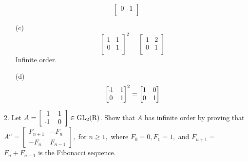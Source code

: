 \begin{mdframed}[style=darkAnswer,frametitle={Joe Starr}]
\begin{multicols}{2}
\begin{itemize}
{$$\begin{bmatrix}
              0 & 1\\
        \end{bmatrix}$$}
  \end{itemize}
\end{multicols}
\begin{multicols}{2}
  \begin{itemize}
    \item[(c)]{ 
                $$\begin{bmatrix}1 & 1 \\ 
                  0 & 1 \\
                \end{bmatrix}^2=\begin{bmatrix}1 & 2 \\ 
                  0 & 1 \\
                \end{bmatrix}$$
                Infinite order.
                }
    \item[(d)]{ 
                $$\begin{bmatrix}\m 1 & 1 \\ 
                  0 & 1 \\
                \end{bmatrix}^2=\begin{bmatrix}1 & 0 \\ 
                  0 & 1 \\
                \end{bmatrix}$$}
  \end{itemize}
\end{multicols}
\end{mdframed}
\newpage
\begin{mdframed}[style=darkQuesion]
  2. Let $A=\left[\begin{array}{rr}1 & \m 1 \\
  \m 1 & 0\end{array}\right] \in \mathrm{GL}_{2}(\mathrm{R})$.
  Show that $A$ has infinite order by proving that 
  $A^{n}=\left[\begin{array}{cc}F_{n+1} & -F_{n} \\
  -F_{n} & F_{n-1}\end{array}\right],$ 
  for $n \geq 1,$ where $F_{0}=0, F_{1}=1,$ and $F_{n+1}=$
  $F_{n}+F_{n-1}$ is the Fibonacci sequence.
\end{mdframed}

